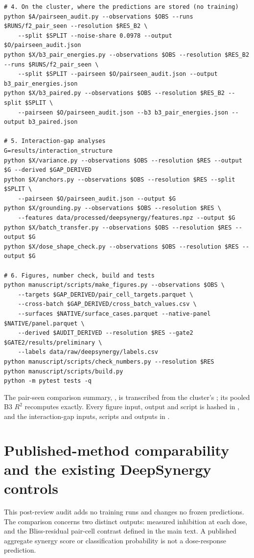 \documentclass[11pt]{article}
\begin{document}
{\begin{verbatim}
# 4. On the cluster, where the predictions are stored (no training)
python $A/pairseen_audit.py --observations $OBS --runs $RUNS/f2_pair_seen --resolution $RES_B2 \
    --split $SPLIT --noise-share 0.0978 --output $O/pairseen_audit.json
python $X/b3_pair_energies.py --observations $OBS --resolution $RES_B2 --runs $RUNS/f2_pair_seen \
    --split $SPLIT --pairseen $O/pairseen_audit.json --output b3_pair_energies.json
python $X/b3_paired.py --observations $OBS --resolution $RES_B2 --split $SPLIT \
    --pairseen $O/pairseen_audit.json --b3 b3_pair_energies.json --output b3_paired.json

# 5. Interaction-gap analyses
G=results/interaction_structure
python $X/variance.py --observations $OBS --resolution $RES --output $G --derived $GAP_DERIVED
python $X/anchors.py --observations $OBS --resolution $RES --split $SPLIT \
    --pairseen $O/pairseen_audit.json --output $G
python $X/grounding.py --observations $OBS --resolution $RES \
    --features data/processed/deepsynergy/features.npz --output $G
python $X/batch_transfer.py --observations $OBS --resolution $RES --output $G
python $X/dose_shape_check.py --observations $OBS --resolution $RES --output $G

# 6. Figures, number check, build and tests
python manuscript/scripts/make_figures.py --observations $OBS \
    --targets $GAP_DERIVED/pair_cell_targets.parquet \
    --cross-batch $GAP_DERIVED/cross_batch_values.csv \
    --surfaces $NATIVE/surface_cases.parquet --native-panel $NATIVE/panel.parquet \
    --derived $AUDIT_DERIVED --resolution $RES --gate2 $GATE2/results/preliminary \
    --labels data/raw/deepsynergy/labels.csv
python manuscript/scripts/check_numbers.py --resolution $RES
python manuscript/scripts/build.py
python -m pytest tests -q
\end{verbatim}
}
The pair-seen comparison summary, , is transcribed from the cluster's ; its pooled B3 $R^2$ recomputes exactly. Every figure input, output and script is hashed in , and the interaction-gap inputs, scripts and outputs in .


\section{Published-method comparability and the existing DeepSynergy controls}\label{sec:S15}
This post-review audit adds no training runs and changes no frozen predictions. The comparison concerns two distinct outputs: measured inhibition at each dose, and the Bliss-residual pair-cell contrast defined in the main text. A published aggregate synergy score or classification probability is not a dose-response prediction.
\end{document}
